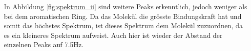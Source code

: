 \documentclass[a4paper]{article}
\newenvironment{Figure}
	{\par\medskip\noindent\minipage{\linewidth}}
	{\endminipage\par\medskip}
\begin{document}
\begin{multicols}{2}
				\begin{Figure}
					\centering
					\label{fig:spektrum_i}
					\vspace*{0.5mm}
				\end{Figure}
				
				In Abbildung \ref{fig:spektrum_ii} sind weitere Peaks
				erkenntlich, jedoch weniger als bei dem aromatischen Ring. Da das  Molekül die
				grösste Bindungskraft hat und somit das höchstes Spektrum, ist dieses Spektrum dem
				 Molekül zuzuordnen, da es ein kleineres Spektrum aufweist.
				Auch hier ist wieder der Abstand der einzelnen Peaks auf 7.5Hz.
				

\end{multicols}
\end{document}
